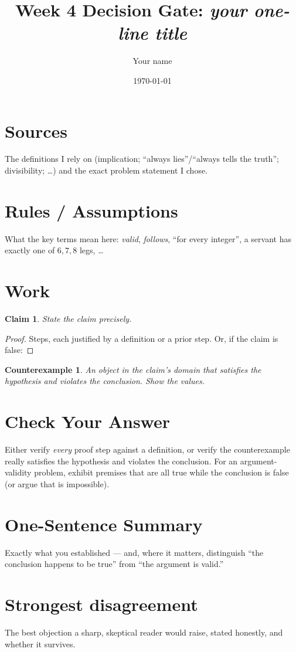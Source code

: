 \documentclass[11pt]{article}
\title{Week 4 Decision Gate: \emph{your one-line title}}
\author{Your name}
\date{\today}
\newtheorem*{claim}{Claim}
\newtheorem*{counterexample}{Counterexample}
\begin{document}
\maketitle

\section*{Sources}
The definitions I rely on (implication; ``always lies''/``always tells the
truth''; divisibility; \dots) and the exact problem statement I chose.

\section*{Rules / Assumptions}
What the key terms mean here: \emph{valid}, \emph{follows}, ``for every
integer'', a servant has exactly one of $6,7,8$ legs, \dots

\section*{Work}
\begin{claim}
State the claim precisely.
\end{claim}

\begin{proof}
Steps, each justified by a definition or a prior step. Or, if the claim is
false:
\end{proof}

\begin{counterexample}
An object in the claim's domain that satisfies the hypothesis and violates
the conclusion. Show the values.
\end{counterexample}

\section*{Check Your Answer}
Either verify \emph{every} proof step against a definition, or verify the
counterexample really satisfies the hypothesis and violates the conclusion.
For an argument-validity problem, exhibit premises that are all true while
the conclusion is false (or argue that is impossible).

\section*{One-Sentence Summary}
Exactly what you established --- and, where it matters, distinguish
``the conclusion happens to be true'' from ``the argument is valid.''

\section*{Strongest disagreement}
The best objection a sharp, skeptical reader would raise, stated honestly,
and whether it survives.
\end{document}
